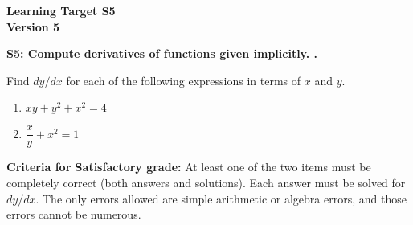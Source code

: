 \documentclass[10pt]{article}
\begin{document}
	\vspace*{0in}

		\begin{center}
			\textbf{Learning Target S5 \\
			Version 5} 
		\end{center}


\begin{framed}
	\textbf{S5: Compute derivatives of functions given implicitly.
.}
\end{framed}

Find $dy/dx$ for each of the following expressions in terms of $x$ and $y$. 

\begin{enumerate}
    \item $xy + y^2 + x^2 = 4$
    \item $\dfrac{x}{y}+ x^2 = 1$
\end{enumerate}

\vfill


\begin{small}
    \begin{framed}
        	\textbf{Criteria for Satisfactory grade:} At least one of the two items must be completely correct (both answers and solutions). Each answer must be solved for $dy/dx$. The only errors allowed are simple arithmetic or algebra errors, and those errors cannot be numerous.
    \end{framed}

\end{small}
\end{document}
